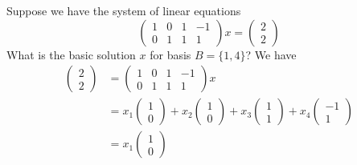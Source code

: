 \begin{problem}[]
    Suppose we have the system of linear equations
    $$\begin{pmatrix}
            1 & 0 & 1 & -1 \\
            0 & 1 & 1 & 1
        \end{pmatrix} x = \begin{pmatrix}
            2 \\ 2
        \end{pmatrix}$$ What is the basic solution $x$ for basis $B = \{1,4\}$?
    We have
    \begin{align*}
        \begin{pmatrix}
            2 \\ 2
        \end{pmatrix} & = \begin{pmatrix}
                              1 & 0 & 1 & -1 \\
                              0 & 1 & 1 & 1
                          \end{pmatrix} x                                                                               \\
                        & = x_1 \begin{pmatrix}
                                    1 \\ 0
                                \end{pmatrix} + x_2 \begin{pmatrix}
                                                        1 \\ 0
                                                    \end{pmatrix} + x_3 \begin{pmatrix}
                                                                            1 \\ 1
                                                                        \end{pmatrix} + x_4 \begin{pmatrix}
                                                                                                -1 \\ 1
                                                                                            \end{pmatrix}              \\
                        & = x_1 \begin{pmatrix}
                                    1 \\ 0

\end{pmatrix}
\end{align*}
\end{problem}
